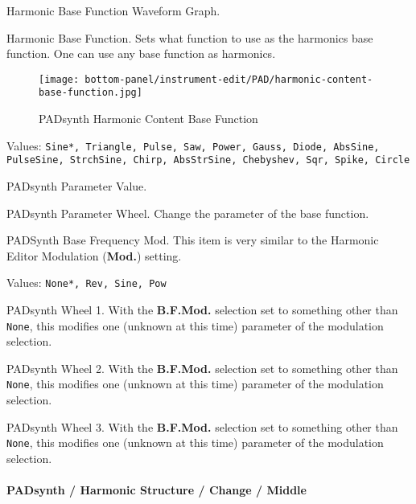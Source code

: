    Harmonic Base Function Waveform Graph.

   Harmonic Base Function.
   Sets what function to use as the harmonics base function.
   One can use any base function as harmonics.

\begin{figure}[H]
   \centering
   \texttt{[image: bottom-panel/instrument-edit/PAD/harmonic-content-base-function.jpg]}
   \caption{PADsynth Harmonic Content Base Function}
   \label{fig:padsynth_harmonic_content_base_function}
\end{figure}

   Values: \texttt{Sine*, Triangle, Pulse, Saw, Power, Gauss, Diode, AbsSine,
           PulseSine, StrchSine, Chirp, AbsStrSine, Chebyshev,
           Sqr, Spike, Circle}

   PADsynth Parameter Value.

   PADsynth Parameter Wheel.
   Change the parameter of the base function.

   PADSynth Base Frequency Mod.
   This item is very similar to the Harmonic Editor Modulation
   (\textbf{Mod.}) setting.

   Values: \texttt{None*, Rev, Sine, Pow}

   PADsynth Wheel 1.
   With the \textbf{B.F.Mod.} selection set to something other than
   \texttt{None}, this modifies one (unknown at this time) parameter of the
   modulation selection.

   PADsynth Wheel 2.
   With the \textbf{B.F.Mod.} selection set to something other than
   \texttt{None}, this modifies one (unknown at this time) parameter of the
   modulation selection.

   PADsynth Wheel 3.
   With the \textbf{B.F.Mod.} selection set to something other than
   \texttt{None}, this modifies one (unknown at this time) parameter of the
   modulation selection.

\paragraph{PADsynth / Harmonic Structure / Change / Middle}
\label{paragraph:padsynth_harmonic_structure_change_middle}

